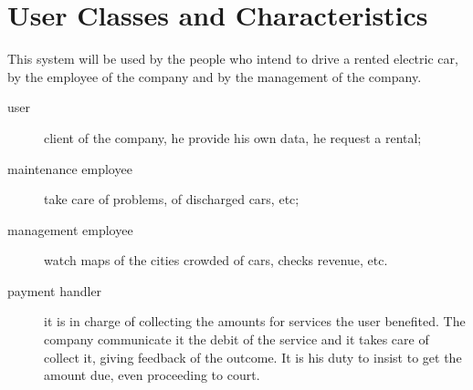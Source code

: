 \documentclass{scrreprt}
\begin{document}
\section{User Classes and Characteristics}
This system will be used by the people who intend to drive a rented electric car, by the employee of the company and by the management of the company.
\begin{description}
\item [user] client of the company, he provide his own data, he request a rental;
\item [maintenance employee] take care of problems, of discharged cars, etc;
\item [management employee] watch maps of the cities crowded of cars, checks revenue, etc.
\item [payment handler] it is in charge of collecting the amounts for services the user benefited. The company communicate it the debit of the service and it takes care of collect it, giving feedback of the outcome. It is his duty to insist to get the amount due, even proceeding to court.
\end{description}
\begin{comment}$<$Identify the various user classes that you anticipate will use this product.  
User classes may be differentiated based on frequency of use, subset of product 
functions used, technical expertise, security or privilege levels, educational 
level, or experience. Describe the pertinent characteristics of each user class.  
Certain requirements may pertain only to certain user classes. Distinguish the 
most important user classes for this product from those who are less important 
to satisfy.$>$
\end{comment}
\begin{comment}
\section{Operating Environment}
\begin{comment}$<$Describe the environment in which the software will operate, including the hardware platform, operating system and versions, and any other software 
components or applications with which it must peacefully coexist.$>$
\end{comment}
\end{document}

